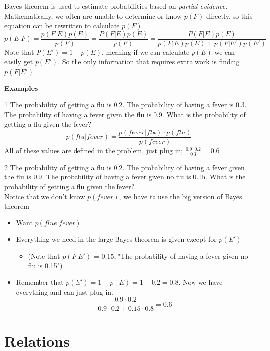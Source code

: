\documentclass[12pt, letterpaper]{article}
\newcommand{\exheader}[1][ex]{{\tiny{#1}\normalsize}}
\begin{document}
\pagebreak

Bayes theorem is used to estimate probabilities based on \emph{partial evidence}. Mathematically, we often are unable to determine or know $p(F)$ directly, so this equation can be rewritten to calculate $p(F)$. 
\[p(E|F) = \frac{p(F|E)p(E)}{p(F)} = \frac{P(F|E)p(E)}{p(F)} = \frac{P(F|E)p(E)}{p(F|E)p(E) + p(F|E')p(E')} \]
Note that $P(E') = 1 - p(E)$, meaning if we can calculate $p(E)$ we can easily get $p(E')$. So the only information that requires extra work is finding $p(F | E')$

\bigbreak \bigbreak

\textbf{Examples} \bigbreak

\exheader[1] The probability of getting a flu is 0.2. The probability of having a fever is 0.3. The probability of having a fever given the flu is 0.9. What is the probability of getting a flu given the fever?
\[ p(flu | fever) = \frac{p(fever |flu) \cdot p(flu)}{p(fever)} \]
All of these values are defined in the problem, just plug in; $\frac{0.9 \cdot 0.2}{0.3} = 0.6$

\bigbreak \bigbreak

\exheader[2] The probability of getting a flu is 0.2. The probability of having a fever given the flu is 0.9. The probability of having a fever given no flu is 0.15. What is the probability of getting a flu given the fever? \\ 
{\small Notice that we don't know $p(fever)$, we have to use the big version of Bayes theorem}
\begin{itemize}[leftmargin=*, label={}]
	\item Want $p(flue | fever)$
	\item Everything we need in the large Bayes theorem is given except for $p(E')$
	\begin{itemize}
		\item[] {\tiny (Note that $p(F | E')$ = 0.15, "The probability of having a fever given no flu is 0.15") }
	\end{itemize}
	\item Remember that $p(E') = 1 - p(E) = 1 - 0.2 = 0.8$. Now we have everything and can just plug-in. \[ \frac{0.9 \cdot 0.2}{0.9 \cdot 0.2 + 0.15 \cdot 0.8} = 0.6  \]
\end{itemize}

\pagebreak

\section{Relations}
\end{document}
